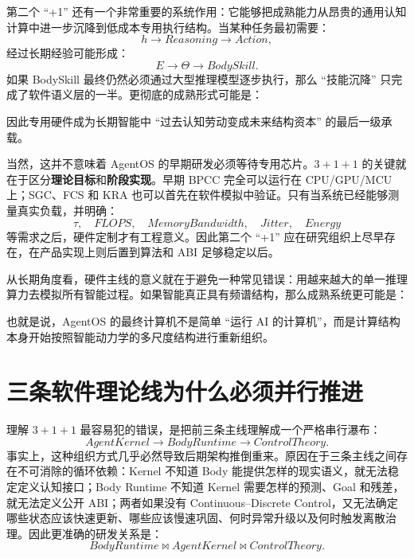 第二个 ``+1'' 还有一个非常重要的系统作用：它能够把成熟能力从昂贵的通用认知计算中进一步沉降到低成本专用执行结构。当某种任务最初需要：
\[
h
\rightarrow
Reasoning
\rightarrow
Action,
\]
经过长期经验可能形成：
\[
E
\rightarrow
\Theta
\rightarrow
BodySkill.
\]
如果 BodySkill 最终仍然必须通过大型推理模型逐步执行，那么 ``技能沉降'' 只完成了软件语义层的一半。更彻底的成熟形式可能是：
\begin{statementbox}
\centering
{}
\end{statementbox}
因此专用硬件成为长期智能中 ``过去认知劳动变成未来结构资本'' 的最后一级承载。

当然，这并不意味着 AgentOS 的早期研发必须等待专用芯片。$3+1+1$ 的关键就在于区分\textbf{理论目标}和\textbf{阶段实现}。早期 BPCC 完全可以运行在 CPU/GPU/MCU 上；SGC、FCS 和 KRA 也可以首先在软件模拟中验证。只有当系统已经能够测量真实负载，并明确：
\[
\tau,\quad FLOPS,\quad MemoryBandwidth,\quad Jitter,\quad Energy
\]
等需求之后，硬件定制才有工程意义。因此第二个 ``+1'' 应在研究组织上尽早存在，在产品实现上则后置到算法和 ABI 足够稳定以后。

从长期角度看，硬件主线的意义就在于避免一种常见错误：用越来越大的单一推理算力去模拟所有智能过程。如果智能真正具有频谱结构，那么成熟系统更可能是：
\begin{statementbox}
\centering
{}
\end{statementbox}
也就是说，AgentOS 的最终计算机不是简单 ``运行 AI 的计算机''，而是计算结构本身开始按照智能动力学的多尺度结构进行重新组织。

\section{三条软件理论线为什么必须并行推进}
\label{sec:roadmap-three-lines-parallel}

理解 $3+1+1$ 最容易犯的错误，是把前三条主线理解成一个严格串行瀑布：
\[
AgentKernel
\rightarrow
BodyRuntime
\rightarrow
ControlTheory.
\]
事实上，这种组织方式几乎必然导致后期架构推倒重来。原因在于三条主线之间存在不可消除的循环依赖：Kernel 不知道 Body 能提供怎样的现实语义，就无法稳定定义认知接口；Body Runtime 不知道 Kernel 需要怎样的预测、Goal 和残差，就无法定义公开 ABI；两者如果没有 Continuous--Discrete Control，又无法确定哪些状态应该快速更新、哪些应该慢速巩固、何时异常升级以及何时触发离散治理。因此更准确的研发关系是：
\[
\boxed{
BodyRuntime
\bowtie
AgentKernel
\bowtie
ControlTheory.
}
\]

